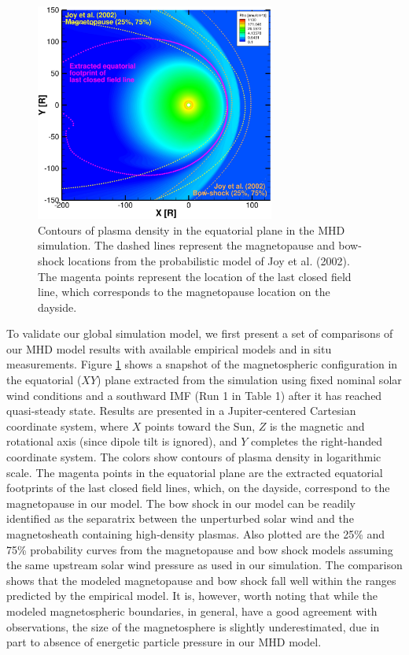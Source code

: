 \begin{figure}
    \centering
    \includegraphics[width=0.7\textwidth]{images2/magnetopause-xy.jpg}
    \caption{Contours of plasma density in the equatorial plane in the MHD simulation. The dashed lines represent the magnetopause and bow-shock locations from the probabilistic model of Joy et al. (2002). The magenta points represent the location of the last closed field line, which corresponds to the magnetopause location on the dayside.}
    \label{fig:magnetopause-xy}
\end{figure}

To validate our global simulation model, we first present a set of comparisons of our MHD model results with available empirical models and in situ measurements. Figure \ref{fig:magnetopause-xy} shows a snapshot of the magnetospheric configuration in the equatorial ($XY$) plane extracted from the simulation using fixed nominal solar wind conditions and a southward IMF (Run 1 in Table 1) after it has reached quasi‐steady state. Results are presented in a Jupiter‐centered Cartesian coordinate system, where $X$ points toward the Sun, $Z$ is the magnetic and rotational axis (since dipole tilt is ignored), and $Y$ completes the right‐handed coordinate system. The colors show contours of plasma density in logarithmic scale. The magenta points in the equatorial plane are the extracted equatorial footprints of the last closed field lines, which, on the dayside, correspond to the magnetopause in our model. The bow shock in our model can be readily identified as the separatrix between the unperturbed solar wind and the magnetosheath containing high‐density plasmas. Also plotted are the 25\% and 75\% probability curves from the \cite{Joy2002a} magnetopause and bow shock models assuming the same upstream solar wind pressure as used in our simulation. The comparison shows that the modeled magnetopause and bow shock fall well within the ranges predicted by the  empirical model. It is, however, worth noting that while the modeled magnetospheric boundaries, in general, have a good agreement with observations, the size of the magnetosphere is slightly underestimated, due in part to absence of energetic particle pressure in our MHD model. 

